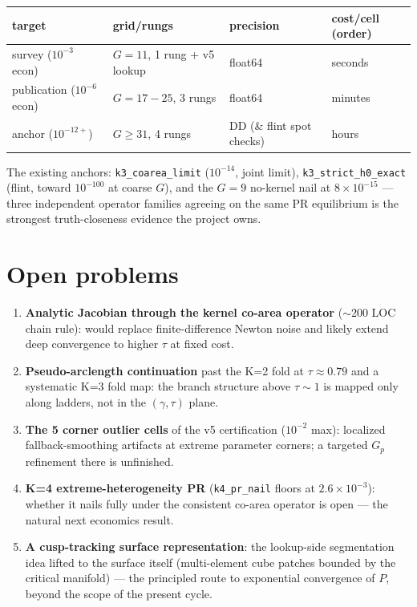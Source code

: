 \begin{center}\begin{tabularx}{\linewidth}{lXXX}\toprule
target & grid/rungs & precision & cost/cell (order) \\
\midrule
survey ($10^{-3}$ econ) & $G{=}11$, 1 rung + v5 lookup & float64 & seconds \\
publication ($10^{-6}$ econ) & $G{=}17{-}25$, 3 rungs & float64 & minutes \\
anchor ($10^{-12+}$) & $G{\ge}31$, 4 rungs & DD (\& flint spot checks) & hours \\
\bottomrule\end{tabularx}\end{center}

The existing anchors: \texttt{k3\_coarea\_limit} ($10^{-14}$, joint
limit), \texttt{k3\_strict\_h0\_exact} (flint, toward $10^{-100}$ at
coarse $G$), and the $G{=}9$ no-kernel nail at $8\times10^{-15}$ ---
three independent operator families agreeing on the same PR equilibrium
is the strongest truth-closeness evidence the project owns.

\chapter{Open problems}

\begin{enumerate}\itemsep2pt
  \item \textbf{Analytic Jacobian through the kernel co-area operator}
        ($\sim 200$ LOC chain rule): would replace finite-difference
        Newton noise and likely extend deep convergence to higher
        $\tau$ at fixed cost.
  \item \textbf{Pseudo-arclength continuation} past the K=2 fold at
        $\tau \approx 0.79$ and a systematic K=3 fold map: the branch
        structure above $\tau \sim 1$ is mapped only along ladders, not
        in the $(\gamma, \tau)$ plane.
  \item \textbf{The 5 corner outlier cells} of the v5 certification
        ($10^{-2}$ max): localized fallback-smoothing artifacts at
        extreme parameter corners; a targeted $G_p$ refinement there is
        unfinished.
  \item \textbf{K=4 extreme-heterogeneity PR} (\texttt{k4\_pr\_nail}
        floors at $2.6\times10^{-3}$): whether it nails fully under the
        consistent co-area operator is open --- the natural next
        economics result.
  \item \textbf{A cusp-tracking surface representation}: the lookup-side
        segmentation idea lifted to the surface itself (multi-element
        cube patches bounded by the critical manifold) --- the
        principled route to exponential convergence of $P$, beyond the
        scope of the present cycle.
\end{enumerate}
